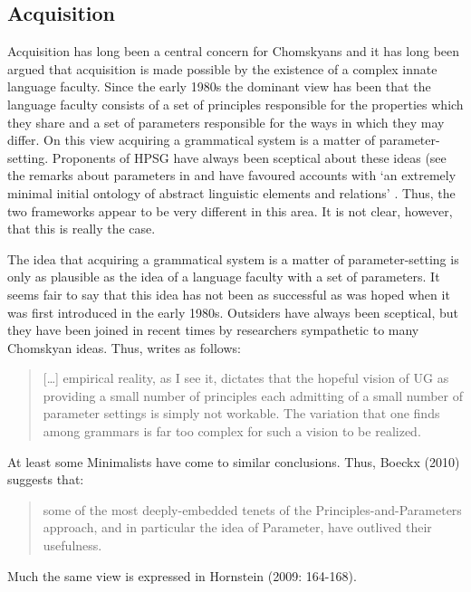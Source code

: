\documentclass[output=paper]{langsci/langscibook}
\begin{document}
\subsection{Acquisition}

Acquisition has long been a central concern for Chomskyans and it has long been argued that
acquisition is made possible by the existence of a complex innate language faculty. Since the early
1980s the dominant view has been that the language faculty consists of a set of principles
responsible for the properties which they share and a set of parameters responsible for the ways in
which they may differ. On this view acquiring a grammatical system is a matter of
parameter-setting. Proponents of HPSG have always been sceptical about these ideas (see \eg the
remarks about parameters in  and have favoured accounts with ‘an extremely
minimal initial ontology of abstract linguistic elements and relations’ \citep[]{Green2011a}. Thus, the
two frameworks appear to be very different in this area. It is not clear, however, that this is
really the case.

The idea that acquiring a grammatical system is a matter of parameter-setting is only as plausible
as the idea of a language faculty with a set of parameters. It seems fair to say that this idea has
not been as successful as was hoped when it was first introduced in the early 1980s.  Outsiders have
always been sceptical, but they have been joined in recent times by researchers sympathetic to many
Chomskyan ideas. Thus, \citet[]{Newmeyer2005a} writes as follows:

\begin{quotation}
[\ldots] empirical reality, as I see it, dictates that the hopeful vision of UG as providing a small
number of principles each admitting of a small number of parameter settings is simply not
workable. The variation that one finds among grammars is far too complex for such a vision to be
realized.
\end{quotation}

At least some Minimalists have come to similar conclusions. Thus, Boeckx (2010) suggests that:
\begin{quotation}
some of the most deeply-embedded tenets of the Principles-and-Parameters approach, and in particular
the idea of Parameter, have outlived their usefulness.
\end{quotation}

Much the same view is expressed in Hornstein (2009: 164-168).
\end{document}
